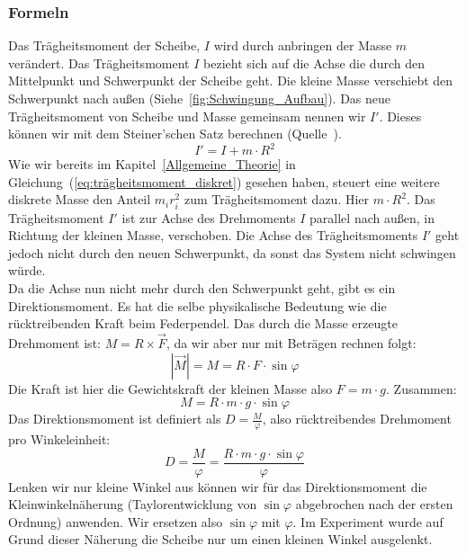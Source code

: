 \documentclass{article}
\begin{document}
	\subsubsection{Formeln}
	Das Trägheitsmoment der Scheibe, \(I\) wird durch anbringen der Masse \(m\) verändert.
	Das Trägheits\-moment \(I\) bezieht sich auf die Achse die durch den Mittelpunkt und Schwerpunkt der Scheibe geht.
	Die kleine Masse verschiebt den Schwerpunkt nach außen (Siehe~\ref{fig:Schwingung_Aufbau}).
	Das neue Trägheitsmoment von Scheibe und Masse gemeinsam nennen wir \(I'\). Dieses können wir mit dem Steiner'schen Satz berechnen (Quelle~\cite{ExPhy1}).
	\begin{equation}\label{eq:Neues_Trägheismoment}
		I' = I + m \cdot R^2
	\end{equation}
	Wie wir bereits im Kapitel~\ref{Allgemeine_Theorie} in Gleichung~(\ref{eq:trägheitsmoment_diskret}) gesehen haben, steuert eine weitere diskrete Masse den Anteil \( m_i r_i^2\)
	zum Trägheitsmoment dazu. Hier \( m \cdot R^2\).
	Das Trägheitsmoment \(I'\) ist zur Achse des Drehmoments \(I\) parallel nach außen, in Richtung der kleinen Masse, verschoben.
	Die Achse des Trägheitsmoments \(I'\) geht jedoch nicht durch den neuen Schwerpunkt, da sonst das System nicht schwingen würde. \\ %
	Da die Achse nun nicht mehr durch den Schwerpunkt geht, gibt es ein Direktionsmoment. Es hat die selbe physikalische Bedeutung wie die rücktreibenden Kraft beim Federpendel.
	Das durch die Masse erzeugte Drehmoment ist: \(M = R \times \vec{F}\), da wir aber nur mit Beträgen rechnen folgt:
	\begin{equation}
		|\vec{M}| = M = R \cdot F \cdot \sin \varphi
	\end{equation}
	Die Kraft ist hier die Gewichtskraft der kleinen Masse also \(F = m \cdot g\). Zusammen:
	\begin{equation}
		M = R \cdot m \cdot g \cdot \sin \varphi
	\end{equation}
	Das Direktionsmoment ist definiert als \(D = \frac{M}{\varphi}\), also rücktreibendes Drehmoment pro Winkeleinheit:
	\begin{equation}
		D = \frac{M}{\varphi} = \frac{ R \cdot m \cdot g \cdot \sin \varphi }{ \varphi }
	\end{equation}
	Lenken wir nur kleine Winkel aus können wir für das Direktionsmoment die Kleinwinkelnäherung (Taylorentwicklung von \( \sin \varphi \) abgebrochen nach der ersten Ordnung)
	anwenden. Wir ersetzen also \( \sin \varphi \) mit \( \varphi \). Im Experiment wurde auf Grund dieser Näherung die Scheibe nur um einen kleinen Winkel ausgelenkt.
\end{document}
